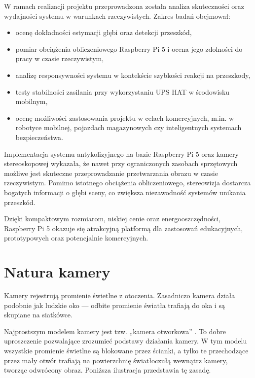 \documentclass[magisterska]{pracadypl}
\begin{document}
\begin{itemize}
\end{itemize}

W ramach realizacji projektu przeprowadzona została analiza skuteczności oraz wydajności systemu w warunkach rzeczywistych. Zakres badań obejmował:

\begin{itemize}
  \item ocenę dokładności estymacji głębi oraz detekcji przeszkód,
  \item pomiar obciążenia obliczeniowego Raspberry Pi 5 i ocena jego zdolności do pracy w czasie rzeczywistym,
  \item analizę responsywności systemu w kontekście szybkości reakcji na przeszkody,
  \item testy stabilności zasilania przy wykorzystaniu UPS HAT w środowisku mobilnym,
  \item ocenę możliwości zastosowania projektu w celach komercyjnych, m.in. w robotyce mobilnej, pojazdach magazynowych czy inteligentnych systemach bezpieczeństwa.
\end{itemize}

Implementacja systemu antykolizyjnego na bazie Raspberry Pi 5 oraz kamery stereoskopowej wykazała, że nawet przy ograniczonych zasobach sprzętowych możliwe jest skuteczne przeprowadzanie przetwarzania obrazu w czasie rzeczywistym. Pomimo istotnego obciążenia obliczeniowego, stereowizja dostarcza bogatych informacji o głębi sceny, co zwiększa niezawodność systemów unikania przeszkód.

Dzięki kompaktowym rozmiarom, niskiej cenie oraz energooszczędności, Raspberry Pi 5 okazuje się atrakcyjną platformą dla zastosowań edukacyjnych, prototypowych oraz potencjalnie komercyjnych.

\chapter{Natura kamery}

Kamery rejestrują promienie świetlne z otoczenia. Zasadniczo kamera działa podobnie jak ludzkie oko — odbite promienie światła trafiają do oka i są skupiane na siatkówce.

Najprostszym modelem kamery jest tzw. „kamera otworkowa” \cite{otworkowa}. To dobre uproszczenie pozwalające zrozumieć podstawy działania kamery. W tym modelu wszystkie promienie świetlne są blokowane przez ścianki, a tylko te przechodzące przez mały otwór trafiają na powierzchnię światłoczułą wewnątrz kamery, tworząc odwrócony obraz. Poniższa ilustracja przedstawia tę zasadę.
\end{document}
